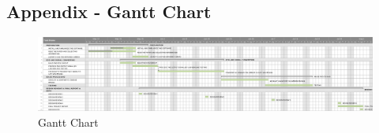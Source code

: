 \documentclass[paper=letter, fontsize=11pt]{scrartcl}
\numberwithin{equation}{section}		%
\numberwithin{figure}{section}			%
\numberwithin{table}{section}			%
\begin{document}
\pagebreak


\pagebreak
\begin{landscape}
\section{Appendix - Gantt Chart}
\begin{figure}[H]
    	\advance\leftskip-1.5cm
	\includegraphics[scale=0.7]{GANTT}
	\caption{Gantt Chart}
\end{figure}
\end{landscape}
\end{document}
